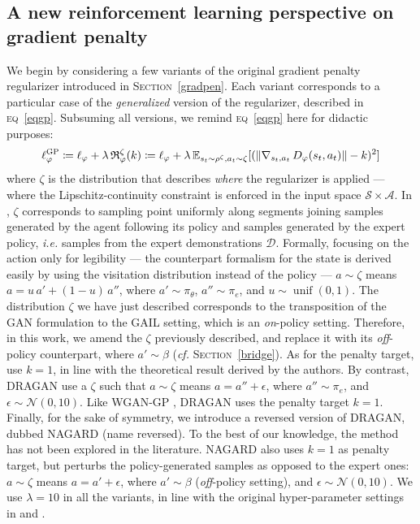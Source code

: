 \subsection{A new reinforcement learning perspective on gradient penalty}
\label{gradpenrl}

We begin by considering a few variants of the original gradient penalty regularizer
\cite{Gulrajani2017-mr}
introduced in \textsc{Section}~\ref{gradpen}.
Each variant corresponds to a particular case of the \emph{generalized} version of the
regularizer, described in \textsc{eq}~\ref{eqgp}.
Subsuming all versions, we remind \textsc{eq}~\ref{eqgp} here for didactic purposes:
\begin{align}
\ell_\varphi^\textsc{GP}
\coloneqq \ell_\varphi + \lambda \, \mathfrak{R}_\varphi^\zeta (k)
\coloneqq \ell_\varphi + \lambda \,
\mathbb{E}_{s_t \sim \rho^{\zeta}, a_t \sim \zeta}
[(\lVert  \nabla _{s_t,a_t} \, D_\varphi(s_t,a_t) \rVert - k )^2]
\end{align}
where $\zeta$ is the distribution that describes \emph{where} the regularizer is applied
--- where the Lipschitz-continuity constraint is enforced in the input space
$\mathcal{S} \times \mathcal{A}$.
In \cite{Gulrajani2017-mr}, $\zeta$ corresponds to sampling point uniformly along segments
joining samples generated by the agent following its policy and samples generated by
the expert policy, \textit{i.e.} samples from the expert demonstrations $\mathcal{D}$.
Formally, focusing on the action only for legibility --- the counterpart formalism
for the state is derived easily by using the visitation distribution instead of the policy ---
$a \sim \zeta$ means $a = u \, a' + (1-u) \, a''$, where $a' \sim \pi_\theta$, $a'' \sim \pi_e$,
and $u \sim \operatorname{unif}(0,1)$.
The distribution $\zeta$ we have just described corresponds to the transposition of the
GAN formulation to the GAIL setting, which is an \emph{on}-policy setting.
Therefore, in this work, we amend the $\zeta$ previously described,
and replace it with its \emph{off}-policy counterpart, where
$a' \sim \beta$ (\textit{cf.} \textsc{Section}~\ref{bridge}).
As for the penalty target, \cite{Gulrajani2017-mr} use $k=1$, in line with the theoretical
result derived by the authors.
By contrast, DRAGAN \cite{Kodali2017-xt} use a $\zeta$ such that
$a \sim \zeta$ means $a = a'' + \epsilon$, where $a'' \sim \pi_e$,
and $\epsilon \sim \mathcal{N}(0, 10)$.
Like WGAN-GP \cite{Gulrajani2017-mr}, DRAGAN uses the penalty target $k=1$.
Finally, for the sake of symmetry, we introduce a reversed version of DRAGAN,
dubbed NAGARD (name reversed).
To the best of our knowledge, the method has not been explored in the literature.
NAGARD also uses $k=1$ as penalty target, but perturbs the policy-generated samples
as opposed to the expert ones:
$a \sim \zeta$ means $a = a' + \epsilon$, where $a' \sim \beta$
(\emph{off}-policy setting),
and $\epsilon \sim \mathcal{N}(0, 10)$.
We use $\lambda=10$ in all the variants, in line with the original
hyper-parameter settings in \cite{Gulrajani2017-mr} and \cite{Kodali2017-xt}.

